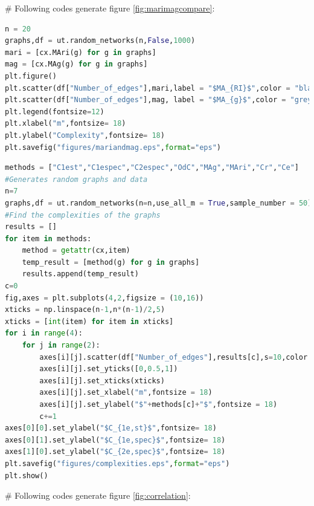 \documentclass[12pt]{article}
\begin{document}
\noindent
\newline
\# Following codes generate figure \ref{fig:marimagcompare}:
\begin{lstlisting}[breaklines=true,language=Python]
n = 20
graphs,df = ut.random_networks(n,False,1000)
mari = [cx.MAri(g) for g in graphs]
mag = [cx.MAg(g) for g in graphs]
plt.figure()
plt.scatter(df["Number_of_edges"],mari,label = "$MA_{RI}$",color = "black",marker = "o",s=10)
plt.scatter(df["Number_of_edges"],mag, label = "$MA_{g}$",color = "grey",marker = "x",s=10)
plt.legend(fontsize=12)
plt.xlabel("m",fontsize= 18)
plt.ylabel("Complexity",fontsize= 18)
plt.savefig("figures/mariandmag.eps",format="eps")
\end{lstlisting}
\begin{lstlisting}[breaklines=true,language=Python]
methods = ["C1est","C1espec","C2espec","OdC","MAg","MAri","Cr","Ce"]
#Generates random graphs and data
n=7
graphs,df = ut.random_networks(n=n,use_all_m = True,sample_number = 50)
#Find the complexities of the graphs
results = []
for item in methods:
    method = getattr(cx,item)
    temp_result = [method(g) for g in graphs]
    results.append(temp_result)
c=0
fig,axes = plt.subplots(4,2,figsize = (10,16))
xticks = np.linspace(n-1,n*(n-1)/2,5)
xticks = [int(item) for item in xticks]
for i in range(4):
    for j in range(2):
        axes[i][j].scatter(df["Number_of_edges"],results[c],s=10,color = "black")
        axes[i][j].set_yticks([0,0.5,1])
        axes[i][j].set_xticks(xticks)
        axes[i][j].set_xlabel("m",fontsize = 18)
        axes[i][j].set_ylabel("$"+methods[c]+"$",fontsize = 18)
        c+=1
axes[0][0].set_ylabel("$C_{1e,st}$",fontsize= 18)
axes[0][1].set_ylabel("$C_{1e,spec}$",fontsize= 18)
axes[1][0].set_ylabel("$C_{2e,spec}$",fontsize= 18)
plt.savefig("figures/complexities.eps",format="eps")
plt.show()


\end{lstlisting}
\noindent
\newline
\# Following codes generate figure \ref{fig:correlation}:
\end{document}
